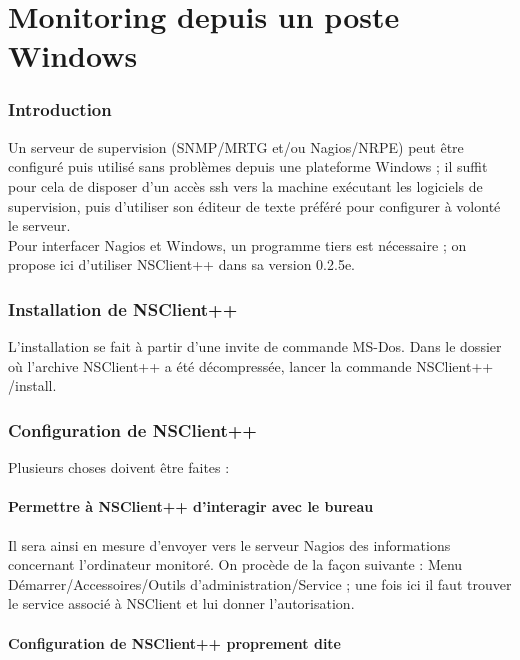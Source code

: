 \vfill \pagebreak
\part{Monitoring depuis un poste Windows}

\section{Introduction}
Un serveur de supervision (SNMP/MRTG et/ou Nagios/NRPE) peut être configuré
puis utilisé sans problèmes depuis une plateforme Windows ; il suffit pour
cela de disposer d'un accès ssh vers la machine exécutant les logiciels de
supervision, puis d'utiliser son éditeur de texte préféré pour configurer à
volonté le serveur.\\

Pour interfacer Nagios et Windows, un programme tiers est nécessaire ; on
propose ici d'utiliser NSClient++ dans sa version 0.2.5e.

\section{Installation de NSClient++}

L'installation se fait à partir d'une invite de commande MS-Dos. Dans le
dossier où l'archive NSClient++ a été décompressée, lancer la commande
NSClient++ /install.

\section{Configuration de NSClient++}

Plusieurs choses doivent être faites :

\subsection{Permettre à NSClient++ d'interagir avec le bureau}

Il sera ainsi en mesure d'envoyer vers le serveur Nagios des informations
concernant l'ordinateur monitoré.
On procède de la façon suivante : Menu Démarrer/Accessoires/Outils
d'administration/Service ; une fois ici il faut trouver le service associé
à NSClient et lui donner l'autorisation.

\subsection{Configuration de NSClient++ proprement dite}

